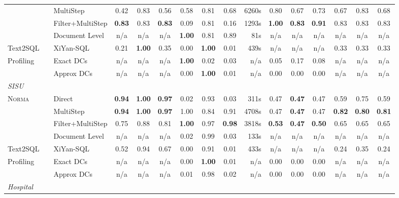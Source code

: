 \begin{table}[t]
\begin{tabular}{llcccccc@{\hspace{0.8em}}r@{\hspace{1.2em}}cccccc}
     & ~~MultiStep & 0.42 & 0.83 & 0.56 & 0.58 & 0.81 & 0.68 & 6260s & 0.80 & 0.67 & 0.73 & 0.67 & 0.83 & 0.68 \\
     & ~~Filter+MultiStep & \textbf{0.83} & 0.83 & \textbf{0.83} & 0.09 & 0.81 & 0.16 & 1293s & \textbf{1.00} & \textbf{0.83} & \textbf{0.91} & 0.83 & 0.83 & 0.83 \\
     & ~~Document Level & n/a & n/a & n/a & \textbf{1.00} & 0.81 & 0.89 & 81s & n/a & n/a & n/a & n/a & n/a & n/a \\
    \cmidrule(l){2-15}
    \multirow{1}{*}{Text2SQL} & ~~XiYan-SQL & 0.21 & \textbf{1.00} & 0.35 & 0.00 & \textbf{1.00} & 0.01 & 439s & n/a & n/a & n/a & 0.33 & 0.33 & 0.33 \\
    \cmidrule(l){2-15}
    \multirow{2}{*}{Profiling} & ~~Exact DCs & n/a & n/a & n/a & \textbf{1.00} & 0.02 & 0.03 & n/a & 0.05 & 0.17 & 0.08 & n/a & n/a & n/a \\
     & ~~Approx DCs & n/a & n/a & n/a & 0.00 & \textbf{1.00} & 0.01 & n/a & 0.00 & 0.00 & 0.00 & n/a & n/a & n/a \\
    \midrule
    \multicolumn{15}{l}{\textit{SISU}} \\
    \multirow{4}{*}{\textsc{Norma}} & ~~Direct & \textbf{0.94} & \textbf{1.00} & \textbf{0.97} & 0.02 & 0.93 & 0.03 & 311s & 0.47 & \textbf{0.47} & 0.47 & 0.59 & 0.75 & 0.59 \\
     & ~~MultiStep & \textbf{0.94} & \textbf{1.00} & \textbf{0.97} & 1.00 & 0.84 & 0.91 & 4708s & 0.47 & \textbf{0.47} & 0.47 & \textbf{0.82} & \textbf{0.80} & \textbf{0.81} \\
     & ~~Filter+MultiStep & 0.75 & 0.88 & 0.81 & \textbf{1.00} & 0.97 & \textbf{0.98} & 3818s & \textbf{0.53} & \textbf{0.47} & \textbf{0.50} & 0.65 & 0.65 & 0.65 \\
     & ~~Document Level & n/a & n/a & n/a & 0.02 & 0.99 & 0.03 & 133s & n/a & n/a & n/a & n/a & n/a & n/a \\
    \cmidrule(l){2-15}
    \multirow{1}{*}{Text2SQL} & ~~XiYan-SQL & 0.52 & 0.94 & 0.67 & 0.00 & 0.91 & 0.01 & 433s & n/a & n/a & n/a & 0.24 & 0.35 & 0.24 \\
    \cmidrule(l){2-15}
    \multirow{2}{*}{Profiling} & ~~Exact DCs & n/a & n/a & n/a & 0.00 & \textbf{1.00} & 0.01 & n/a & 0.00 & 0.00 & 0.00 & n/a & n/a & n/a \\
     & ~~Approx DCs & n/a & n/a & n/a & 0.01 & 0.98 & 0.02 & n/a & 0.00 & 0.00 & 0.00 & n/a & n/a & n/a \\
    \midrule
    \multicolumn{15}{l}{\textit{Hospital}} \\

\end{tabular}
\end{table}

